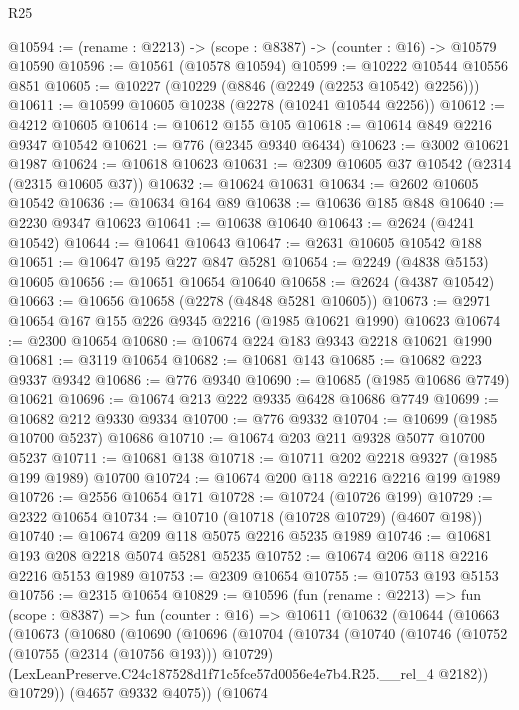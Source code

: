 \begin{lexlean}{R25}
\begin{coremodule}
@10594 := (rename : @2213) -> (scope : @8387) -> (counter : @16) -> @10579 @10590
@10596 := @10561 (@10578 @10594)
@10599 := @10222 @10544 @10556 @851
@10605 := @10227 (@10229 (@8846 (@2249 (@2253 @10542) @2256)))
@10611 := @10599 @10605 @10238 (@2278 (@10241 @10544 @2256))
@10612 := @4212 @10605
@10614 := @10612 @155 @105
@10618 := @10614 @849 @2216 @9347 @10542
@10621 := @776 (@2345 @9340 @6434)
@10623 := @3002 @10621 @1987
@10624 := @10618 @10623
@10631 := @2309 @10605 @37 @10542 (@2314 (@2315 @10605 @37))
@10632 := @10624 @10631
@10634 := @2602 @10605 @10542
@10636 := @10634 @164 @89
@10638 := @10636 @185 @848
@10640 := @2230 @9347 @10623
@10641 := @10638 @10640
@10643 := @2624 (@4241 @10542)
@10644 := @10641 @10643
@10647 := @2631 @10605 @10542 @188
@10651 := @10647 @195 @227 @847 @5281
@10654 := @2249 (@4838 @5153) @10605
@10656 := @10651 @10654 @10640
@10658 := @2624 (@4387 @10542)
@10663 := @10656 @10658 (@2278 (@4848 @5281 @10605))
@10673 := @2971 @10654 @167 @155 @226 @9345 @2216 (@1985 @10621 @1990) @10623
@10674 := @2300 @10654
@10680 := @10674 @224 @183 @9343 @2218 @10621 @1990
@10681 := @3119 @10654
@10682 := @10681 @143
@10685 := @10682 @223 @9337 @9342
@10686 := @776 @9340
@10690 := @10685 (@1985 @10686 @7749) @10621
@10696 := @10674 @213 @222 @9335 @6428 @10686 @7749
@10699 := @10682 @212 @9330 @9334
@10700 := @776 @9332
@10704 := @10699 (@1985 @10700 @5237) @10686
@10710 := @10674 @203 @211 @9328 @5077 @10700 @5237
@10711 := @10681 @138
@10718 := @10711 @202 @2218 @9327 (@1985 @199 @1989) @10700
@10724 := @10674 @200 @118 @2216 @2216 @199 @1989
@10726 := @2556 @10654 @171
@10728 := @10724 (@10726 @199)
@10729 := @2322 @10654
@10734 := @10710 (@10718 (@10728 @10729) (@4607 @198))
@10740 := @10674 @209 @118 @5075 @2216 @5235 @1989
@10746 := @10681 @193 @208 @2218 @5074 @5281 @5235
@10752 := @10674 @206 @118 @2216 @2216 @5153 @1989
@10753 := @2309 @10654
@10755 := @10753 @193 @5153
@10756 := @2315 @10654
@10829 := @10596
    (fun (rename : @2213) =>
    fun (scope : @8387) =>
    fun (counter : @16) =>
    @10611
      (@10632
        (@10644
          (@10663
            (@10673
              (@10680
                (@10690
                  (@10696
                    (@10704
                      (@10734
                        (@10740
                          (@10746
                            (@10752 (@10755 (@2314 (@10756 @193))) @10729)
                            (LexLeanPreserve.C24c187528d1f71c5fce57d0056e4e7b4.R25.__rel_4 @2182))
                          @10729))
                      (@4657 @9332 @4075))
                    (@10674

\end{coremodule}
\end{lexlean}
